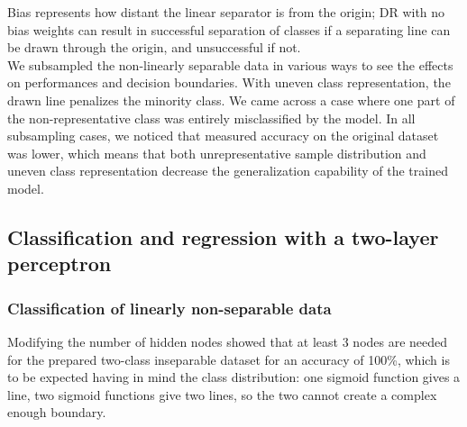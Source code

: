 \documentclass[a4paper]{article}
\begin{document}
Bias represents how distant the linear separator is from the origin; DR with no bias weights can result in successful separation of classes if a separating line can be drawn through the origin, and unsuccessful if not.\\
We subsampled the non-linearly separable data in various ways to see the effects on performances and decision boundaries. With uneven class representation, the drawn line penalizes the minority class. We came across a case where one part of the non-representative class was entirely misclassified by the model.
In all subsampling cases, we noticed that measured accuracy on the original dataset  was lower, which means that both unrepresentative sample distribution and uneven class representation decrease the generalization capability of the trained model.
\subsection{Classification and regression with a two-layer perceptron} %
\subsubsection{Classification of linearly non-separable data}

Modifying the number of hidden nodes showed that at least 3 nodes are needed for the prepared two-class inseparable dataset for an accuracy of 100\%, which is to be expected having in mind the class distribution: one sigmoid function gives a line, two sigmoid functions give two lines, so the two cannot create a complex enough boundary.
\end{document}
